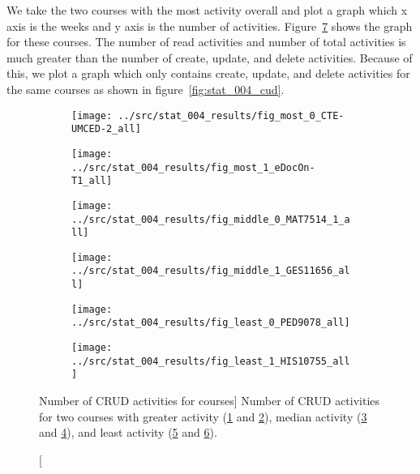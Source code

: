 We take the two courses with the most activity overall and plot a graph which x
axis is the weeks and y axis is the number of activities.
Figure~\ref{fig:stat_004_all} shows the graph for these courses. The number of
read activities and number of total activities is much greater than the number
of create, update, and delete activities. Because of this, we plot a graph
which only contains create, update, and delete activities for the same courses
as shown in figure~\ref{fig:stat_004_cud}.

\begin{figure}[h!]
    \centering

    \begin{subfigure}{.5\textwidth}
        \centering
        \texttt{[image: ../src/stat\_004\_results/fig\_most\_0\_CTE-UMCED-2\_all]}
        \caption[]{}
        \label{subfig:stat_most_004_0_all}
    \end{subfigure}%
    \begin{subfigure}{.5\textwidth}
        \centering
        \texttt{[image: ../src/stat\_004\_results/fig\_most\_1\_eDocOn-T1\_all]}
        \caption[]{}
        \label{subfig:stat_most_004_1_all}
    \end{subfigure}

    \begin{subfigure}{.5\textwidth}
        \centering
        \texttt{[image: ../src/stat\_004\_results/fig\_middle\_0\_MAT7514\_1\_all]}
        \caption[]{}
        \label{subfig:stat_middle_004_0_all}
    \end{subfigure}%
    \begin{subfigure}{.5\textwidth}
        \centering
        \texttt{[image: ../src/stat\_004\_results/fig\_middle\_1\_GES11656\_all]}
        \caption[]{}
        \label{subfig:stat_middle_004_1_all}
    \end{subfigure}

    \begin{subfigure}{.5\textwidth}
        \centering
        \texttt{[image: ../src/stat\_004\_results/fig\_least\_0\_PED9078\_all]}
        \caption[]{}
        \label{subfig:stat_least_004_0_all}
    \end{subfigure}%
    \begin{subfigure}{.5\textwidth}
        \centering
        \texttt{[image: ../src/stat\_004\_results/fig\_least\_1\_HIS10755\_all]}
        \caption[]{}
        \label{subfig:stat_least_004_1_all}
    \end{subfigure}

    \caption
        [Number of CRUD activities for courses]
        {Number of CRUD activities for two courses with greater activity
        (\ref{subfig:stat_most_004_0_all} and
        \ref{subfig:stat_most_004_1_all}), median activity
        (\ref{subfig:stat_middle_004_0_all} and
        \ref{subfig:stat_middle_004_1_all}), and least activity
        (\ref{subfig:stat_least_004_0_all} and
        \ref{subfig:stat_least_004_1_all}).}

    \label{fig:stat_004_all}
\end{figure}

